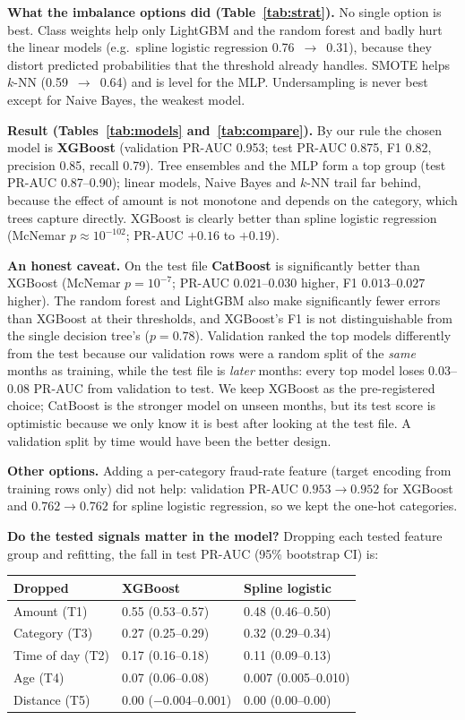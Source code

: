 \documentclass[10pt,a4paper,twocolumn]{article}
\begin{document}
\textbf{What the imbalance options did (Table~\ref{tab:strat}).} No single option is best.
Class weights help only LightGBM and the random forest and badly hurt the linear models (e.g.\
spline logistic regression 0.76~$\to$~0.31), because they distort predicted probabilities that the
threshold already handles. SMOTE helps $k$-NN (0.59~$\to$~0.64) and is level for the MLP.
Undersampling is never best except for Naive Bayes, the weakest model.



\textbf{Result (Tables~\ref{tab:models} and~\ref{tab:compare}).} By our rule the chosen model is
\textbf{XGBoost} (validation PR-AUC 0.953; test PR-AUC 0.875, F1 0.82, precision 0.85, recall 0.79).
Tree ensembles and the MLP form a top group (test PR-AUC 0.87--0.90); linear models, Naive Bayes
and $k$-NN trail far behind, because the effect of amount is not monotone and depends on the
category, which trees capture directly. XGBoost is clearly better than spline logistic regression
(McNemar $p\approx10^{-102}$; PR-AUC $+0.16$ to $+0.19$).

\textbf{An honest caveat.} On the test file \textbf{CatBoost} is significantly better than XGBoost
(McNemar $p=10^{-7}$; PR-AUC $0.021$--$0.030$ higher, F1 $0.013$--$0.027$ higher). The random
forest and LightGBM also make significantly fewer errors than XGBoost at their thresholds, and
XGBoost's F1 is not distinguishable from the single decision tree's ($p=0.78$). Validation ranked the top
models differently from the test because our validation rows were a random split of the
\emph{same} months as training, while the test file is \emph{later} months: every top model loses
0.03--0.08 PR-AUC from validation to test. We keep XGBoost as the pre-registered choice; CatBoost is
the stronger model on unseen months, but its test score is optimistic because we only know it is
best after looking at the test file. A validation split by time would have been the better design.

\textbf{Other options.} Adding a per-category fraud-rate feature (target encoding from training
rows only) did not help: validation PR-AUC $0.953\to0.952$ for XGBoost and $0.762\to0.762$ for
spline logistic regression, so we kept the one-hot categories.

\textbf{Do the tested signals matter in the model?} Dropping each tested feature group and
refitting, the fall in test PR-AUC (95\% bootstrap CI) is:

{\footnotesize
\begin{tabularx}{\linewidth}{@{}L{2.2cm} Y Y@{}}
\toprule
\textbf{Dropped} & \textbf{XGBoost} & \textbf{Spline logistic} \\
\midrule
Amount (T1) & 0.55 (0.53--0.57) & 0.48 (0.46--0.50) \\
Category (T3) & 0.27 (0.25--0.29) & 0.32 (0.29--0.34) \\
Time of day (T2) & 0.17 (0.16--0.18) & 0.11 (0.09--0.13) \\
Age (T4) & 0.07 (0.06--0.08) & 0.007 (0.005--0.010) \\
Distance (T5) & 0.00 ($-0.004$--$0.001$) & 0.00 (0.00--0.00) \\
\bottomrule
\end{tabularx}}
\end{document}

